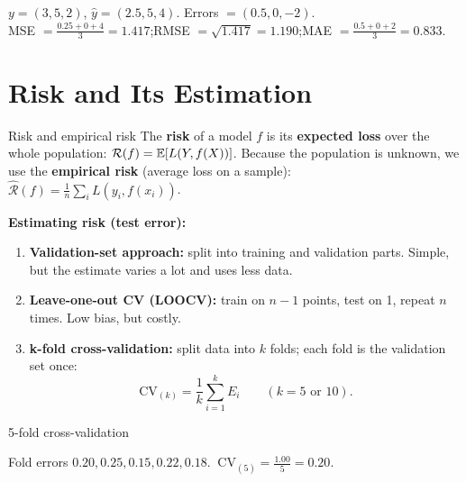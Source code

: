 \begin{numer}
$y=(3,5,2)$, $\hat y=(2.5,5,4)$. Errors $=(0.5,0,-2)$.\\
MSE $=\frac{0.25+0+4}{3}=1.417$;\quad RMSE $=\sqrt{1.417}=1.190$;\quad MAE $=\frac{0.5+0+2}{3}=0.833$.
\end{numer}

\section{Risk and Its Estimation}
\begin{dfn}{Risk and empirical risk}
The \textbf{risk} of a model $f$ is its \textbf{expected loss} over the whole population: $\mathcal R(f)=\mathbb{E}[L(Y,f(X))]$. Because the population is unknown, we use the \textbf{empirical risk} (average loss on a sample): $\hat{\mathcal R}(f)=\frac1n\sum_iL(y_i,f(x_i))$.
\end{dfn}

\textbf{Estimating risk (test error):}
\begin{enumerate}
  \item \textbf{Validation-set approach:} split into training and validation parts. Simple, but the estimate varies a lot and uses less data.
  \item \textbf{Leave-one-out CV (LOOCV):} train on $n-1$ points, test on 1, repeat $n$ times. Low bias, but costly.
  \item \textbf{k-fold cross-validation:} split data into $k$ folds; each fold is the validation set once:
  \[ \mathrm{CV}_{(k)}=\frac1k\sum_{i=1}^kE_i \qquad (k=5\text{ or }10). \]
\end{enumerate}

\begin{drawit}{5-fold cross-validation}
\centering
{}
\end{drawit}

\begin{numer}[: 5-fold CV]
Fold errors $0.20,0.25,0.15,0.22,0.18$. $\ \mathrm{CV}_{(5)}=\frac{1.00}{5}=\mathbf{0.20}$.
\end{numer}

